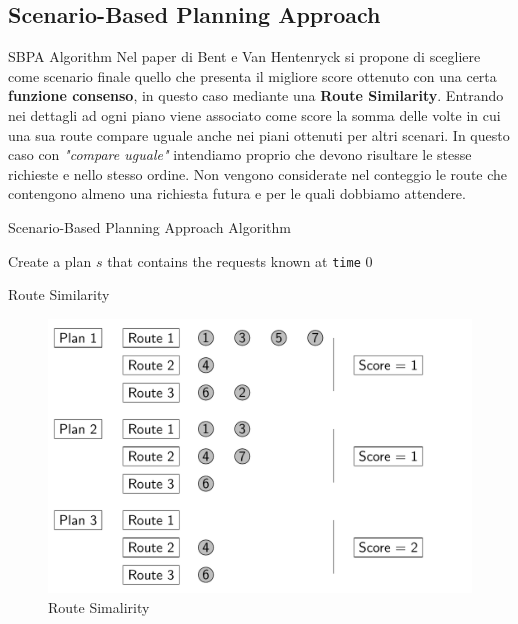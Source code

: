 \documentclass[10pt]{beamer}
\begin{document}
    \subsection{Scenario-Based Planning Approach}\label{sec:sbpa}
    \begin{frame}{SBPA Algorithm}
        Nel paper di Bent e Van Hentenryck\cite{SBPPDVR} si propone di scegliere come scenario finale quello che presenta il migliore score ottenuto con una certa \textbf{funzione consenso}, in questo caso mediante una \textbf{Route Similarity}. Entrando nei dettagli ad ogni piano viene associato come score la somma delle volte in cui una sua route compare uguale anche nei piani ottenuti per altri scenari. In questo caso con \textit{"compare uguale"} intendiamo proprio che devono risultare le stesse richieste e nello stesso ordine. Non vengono considerate nel conteggio le route che contengono almeno una richiesta futura e per le quali dobbiamo attendere.
    \end{frame}

    \begin{frame}{Scenario-Based Planning Approach Algorithm}
        \begin{algorithm}[H]
            \SetAlgoLined
            Create a plan $s$ that contains the requests known at \texttt{time} $0$\;
            \caption{Scenario-based planning approach}
            \label{alg:SBPA}
        \end{algorithm}
    \end{frame}

    \begin{frame}{Route Similarity}
        \begin{figure}
            \centering
            \includegraphics[scale=0.22]{Images/RouteSimilarity.png}
            \caption{Route Simalirity}
            \label{fig:RouteSimilarity}
        \end{figure}
    \end{frame} 
\end{document}
